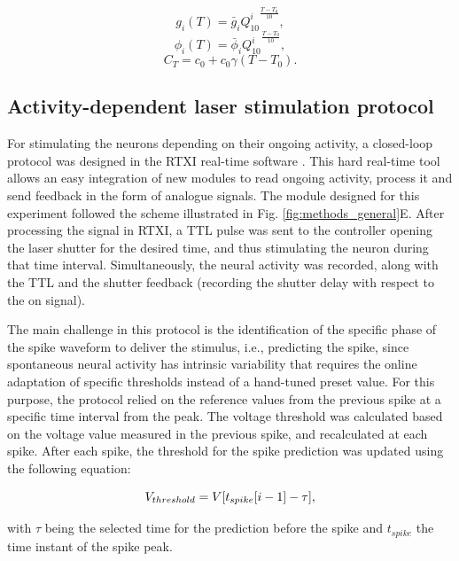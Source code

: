 \begin{equation}g_i(T)=\bar{g}_i{Q^i_{10}}^{\frac{T-T_0}{10}},
\label{Q10_conductance}
\end{equation}
\begin{equation}\phi_i(T)=\bar{\phi}_i{Q^i_{10}}^{\frac{T-T_0}{10}},
\label{Q10_gates}\end{equation}
\begin{equation}C_T=c_0 + c_0 \gamma(T-T_0).\end{equation}

\subsection{Activity-dependent laser stimulation protocol} 
\label{sect:methods-activity-dependent}

For stimulating the neurons depending on their ongoing activity, a closed-loop protocol was designed in the RTXI real-time software \cite{Patel2017}. This hard real-time tool allows an easy integration of new modules to read ongoing activity, process it and send feedback in the form of analogue signals. The module designed for this experiment followed the scheme illustrated in Fig. \ref{fig:methods_general}E. After processing the signal in RTXI, a TTL pulse was sent to the controller opening the laser shutter for the desired time, and thus stimulating the neuron during that time interval. Simultaneously, the neural activity was recorded, along with the TTL and the shutter feedback (recording the shutter delay with respect to the on signal).

The main challenge in this protocol is the identification of the specific phase of the spike waveform to deliver the stimulus, i.e., predicting the spike, since spontaneous neural activity has intrinsic variability that requires the online adaptation of specific thresholds instead of a hand-tuned preset value. For this purpose, the protocol relied on the reference values from the previous spike at a specific time interval from the peak. The voltage threshold was calculated based on the voltage value measured in the previous spike, and recalculated at each spike. After each spike, the threshold for the spike prediction was updated using the following equation:

\begin{equation}
    \centering 
    V_{threshold}=V[t_{spike}[i-1]-\tau],
\end{equation}
    
\noindent with $\tau$ being the selected time for the prediction before the spike and $t_{spike}$ the time instant of the spike peak.

